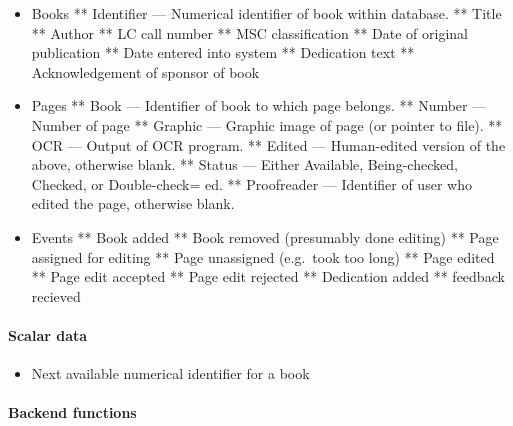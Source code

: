 \begin{itemize}
\begin{itemize}
\item
  Books ** Identifier --- Numerical identifier of book within database.
  ** Title ** Author ** LC call number ** MSC classification ** Date of
  original publication ** Date entered into system ** Dedication text **
  Acknowledgement of sponsor of book
\item
  Pages ** Book --- Identifier of book to which page belongs. ** Number
  --- Number of page ** Graphic --- Graphic image of page (or pointer to
  file). ** OCR --- Output of OCR program. ** Edited --- Human-edited
  version of the above, otherwise blank. ** Status --- Either Available,
  Being-checked, Checked, or Double-check= ed. ** Proofreader ---
  Identifier of user who edited the page, otherwise blank.
\item
  Events ** Book added ** Book removed (presumably done editing) ** Page
  assigned for editing ** Page unassigned (e.g.~took too long) ** Page
  edited ** Page edit accepted ** Page edit rejected ** Dedication added
  ** feedback recieved
\end{itemize}

\paragraph{Scalar data}

\begin{itemize}
\item
  Next available numerical identifier for a book
\end{itemize}

\paragraph{Backend functions}


\end{itemize}
